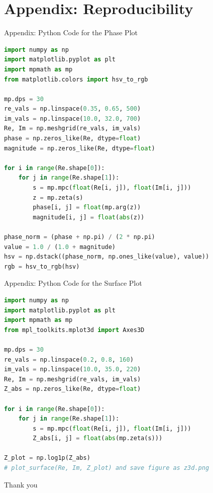 \documentclass[aspectratio=43]{beamer}
\begin{document}
\appendix
\section{Appendix: Reproducibility}

\begin{frame}[fragile]{Appendix: Python Code for the Phase Plot}
\begin{lstlisting}[language=Python]
import numpy as np
import matplotlib.pyplot as plt
import mpmath as mp
from matplotlib.colors import hsv_to_rgb

mp.dps = 30
re_vals = np.linspace(0.35, 0.65, 500)
im_vals = np.linspace(10.0, 32.0, 700)
Re, Im = np.meshgrid(re_vals, im_vals)
phase = np.zeros_like(Re, dtype=float)
magnitude = np.zeros_like(Re, dtype=float)

for i in range(Re.shape[0]):
    for j in range(Re.shape[1]):
        s = mp.mpc(float(Re[i, j]), float(Im[i, j]))
        z = mp.zeta(s)
        phase[i, j] = float(mp.arg(z))
        magnitude[i, j] = float(abs(z))

phase_norm = (phase + np.pi) / (2 * np.pi)
value = 1.0 / (1.0 + magnitude)
hsv = np.dstack((phase_norm, np.ones_like(value), value))
rgb = hsv_to_rgb(hsv)
\end{lstlisting}
\end{frame}

\begin{frame}[fragile]{Appendix: Python Code for the Surface Plot}
\begin{lstlisting}[language=Python]
import numpy as np
import matplotlib.pyplot as plt
import mpmath as mp
from mpl_toolkits.mplot3d import Axes3D

mp.dps = 30
re_vals = np.linspace(0.2, 0.8, 160)
im_vals = np.linspace(10.0, 35.0, 220)
Re, Im = np.meshgrid(re_vals, im_vals)
Z_abs = np.zeros_like(Re, dtype=float)

for i in range(Re.shape[0]):
    for j in range(Re.shape[1]):
        s = mp.mpc(float(Re[i, j]), float(Im[i, j]))
        Z_abs[i, j] = float(abs(mp.zeta(s)))

Z_plot = np.log1p(Z_abs)
# plot_surface(Re, Im, Z_plot) and save figure as z3d.png
\end{lstlisting}
\end{frame}

\begin{frame}[plain,t]
\vspace{100pt}
\centering
\Large Thank you
\end{frame}
\end{document}
